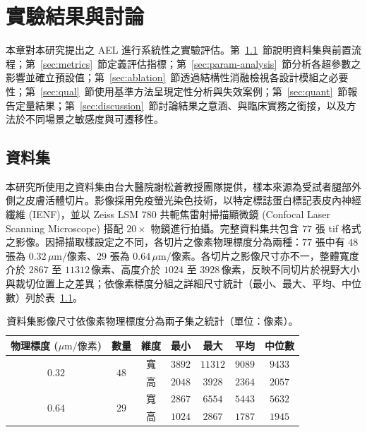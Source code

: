 
\chapter{實驗結果與討論}
\label{chap:experiment}

本章對本研究提出之 AEL 進行系統性之實驗評估。第~\ref{sec:dataset}~節說明資料集與前置流程；第~\ref{sec:metrics}~節定義評估指標；第~\ref{sec:param-analysis}~節分析各超參數之影響並確立預設值；第~\ref{sec:ablation}~節透過結構性消融檢視各設計模組之必要性；第~\ref{sec:qual}~節使用基準方法呈現定性分析與失效案例；第~\ref{sec:quant}~節報告定量結果；第~\ref{sec:discussion}~節討論結果之意涵、與臨床實務之銜接，以及方法於不同場景之敏感度與可遷移性。

\section{資料集}
\label{sec:dataset}

本研究所使用之資料集由台大醫院謝松蒼教授團隊提供，樣本來源為受試者腿部外側之皮膚活體切片。影像採用免疫螢光染色技術，以特定標誌蛋白標記表皮內神經纖維 (IENF)，並以 Zeiss LSM 780 共軛焦雷射掃描顯微鏡 (Confocal Laser Scanning Microscope) 搭配 $20\times$ 物鏡進行拍攝。完整資料集共包含 $77$ 張 tif 格式之影像。因掃描取樣設定之不同，各切片之像素物理標度分為兩種：$77$ 張中有 $48$ 張為 $0.32\,\mu\text{m/像素}$、$29$ 張為 $0.64\,\mu\text{m/像素}$。各切片之影像尺寸亦不一，整體寬度介於 $2867$ 至 $11312\,\text{像素}$、高度介於 $1024$ 至 $3928\,\text{像素}$，反映不同切片於視野大小與裁切位置上之差異；依像素標度分組之詳細尺寸統計（最小、最大、平均、中位數）列於表~\ref{tab:dataset-dims}。

\begin{table}[htbp]
  \centering
  \caption[資料集影像尺寸統計]{資料集影像尺寸依像素物理標度分為兩子集之統計（單位：像素）。}
  \label{tab:dataset-dims}
  \begin{tabular}{ccccccc}
    \toprule
    物理標度 ($\mu\text{m/像素}$) & 數量 & 維度 & 最小 & 最大 & 平均 & 中位數 \\
    \midrule
    \multirow{2}{*}{$0.32$} & \multirow{2}{*}{$48$} & 寬  & $3892$ & $11312$ & $9089$ & $9433$ \\
                            &                       & 高  & $2048$ & $3928$  & $2364$ & $2057$ \\
    \midrule
    \multirow{2}{*}{$0.64$} & \multirow{2}{*}{$29$} & 寬  & $2867$ & $6554$  & $5443$ & $5632$ \\
                            &                       & 高  & $1024$ & $2867$  & $1787$ & $1945$ \\
    \bottomrule
  \end{tabular}
\end{table}

